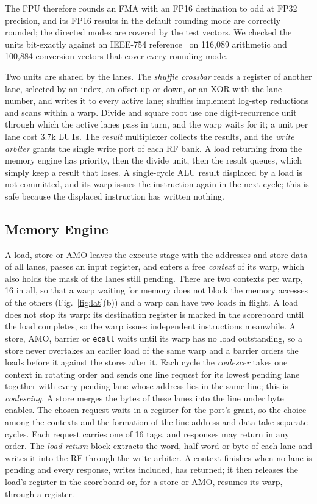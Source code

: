 \documentclass[journal]{IEEEtran}
\begin{document}
The FPU therefore rounds an FMA with an FP16 destination to odd at FP32 precision, and
its FP16 results in the default rounding mode are correctly rounded; the directed
modes are covered by the test vectors. We checked the units bit-exactly against an IEEE-754
reference~\cite{ieee754} on 116,089 arithmetic and 100,884 conversion vectors
that cover every rounding mode.

Two units are shared by the lanes. The \emph{shuffle crossbar} reads a register of
another lane, selected by an index, an offset up or down, or an XOR with the lane
number, and writes it to every active lane; shuffles implement log-step
reductions and scans within a warp. Divide and square root use one
digit-recurrence unit through which the active lanes pass in turn, and the warp
waits for it; a unit per lane cost 3.7k LUTs. The \emph{result} multiplexer
collects the results, and the \emph{write arbiter} grants the single write port
of each RF bank. A load returning from the memory engine has priority, then the
divide unit, then the result queues, which simply keep a result that loses. A
single-cycle ALU result displaced by a load is not committed, and its warp issues
the instruction again in the next cycle; this is safe because the displaced
instruction has written nothing.

\subsection{Memory Engine}
A load, store or AMO leaves the execute stage with the addresses and store data
of all lanes, passes an input register, and enters a free \emph{context} of its
warp, which also holds the mask of the lanes still pending. There are two
contexts per warp, 16 in all, so that a warp waiting for memory does not block
the memory accesses of the others (Fig.~\ref{fig:lat}(b)) and a warp can have
two loads in flight. A load does not stop its warp: its destination register is
marked in the scoreboard until the load completes, so the warp issues
independent instructions meanwhile. A store, AMO, barrier or \texttt{ecall} waits
until its warp has no load outstanding, so a store never overtakes an earlier
load of the same warp and a barrier orders the loads before it against the
stores after it. Each cycle the \emph{coalescer} takes one context in
rotating order and sends one line request for its lowest pending lane together
with every pending lane whose address lies in the same line; this is
\emph{coalescing}. A store merges the bytes of these lanes into the line under
byte enables. The chosen request waits in a register for the port's grant, so
the choice among the contexts and the formation of the line address and data
take separate cycles. Each request carries one of 16 tags, and responses may
return in any order. The \emph{load return} block extracts the word, half-word or
byte of each lane and writes it into the RF through the write arbiter. A context
finishes when no lane is pending and every response, writes included, has
returned; it then releases the load's register in the scoreboard or, for a store
or AMO, resumes its warp, through a register.
\end{document}
